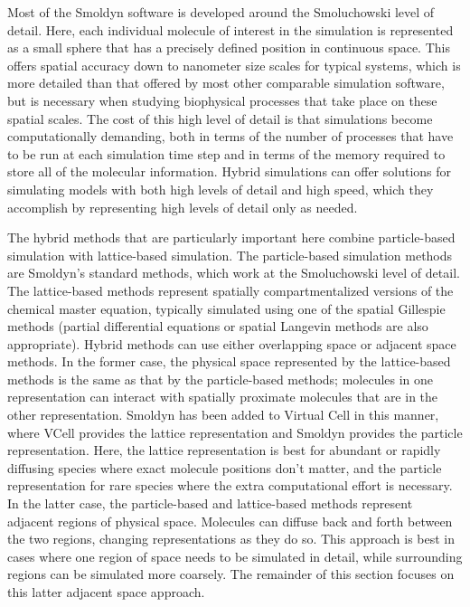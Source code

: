 \documentclass {scrbook}
\begin{document}
Most of the Smoldyn software is developed around the Smoluchowski level of detail. Here, each individual molecule of interest in the simulation is represented as a small sphere that has a precisely defined position in continuous space. This offers spatial accuracy down to nanometer size scales for typical systems, which is more detailed than that offered by most other comparable simulation software, but is necessary when studying biophysical processes that take place on these spatial scales. The cost of this high level of detail is that simulations become computationally demanding, both in terms of the number of processes that have to be run at each simulation time step and in terms of the memory required to store all of the molecular information. Hybrid simulations can offer solutions for simulating models with both high levels of detail and high speed, which they accomplish by representing high levels of detail only as needed.

The hybrid methods that are particularly important here combine particle-based simulation with lattice-based simulation. The particle-based simulation methods are Smoldyn's standard methods, which work at the Smoluchowski level of detail. The lattice-based methods represent spatially compartmentalized versions of the chemical master equation, typically simulated using one of the spatial Gillespie methods (partial differential equations or spatial Langevin methods are also appropriate). Hybrid methods can use either overlapping space or adjacent space methods. In the former case, the physical space represented by the lattice-based methods is the same as that by the particle-based methods; molecules in one representation can interact with spatially proximate molecules that are in the other representation. Smoldyn has been added to Virtual Cell in this manner, where VCell provides the lattice representation and Smoldyn provides the particle representation. Here, the lattice representation is best for abundant or rapidly diffusing species where exact molecule positions don't matter, and the particle representation for rare species where the extra computational effort is necessary. In the latter case, the particle-based and lattice-based methods represent adjacent regions of physical space. Molecules can diffuse back and forth between the two regions, changing representations as they do so. This approach is best in cases where one region of space needs to be simulated in detail, while surrounding regions can be simulated more coarsely. The remainder of this section focuses on this latter adjacent space approach.
\end{document}
